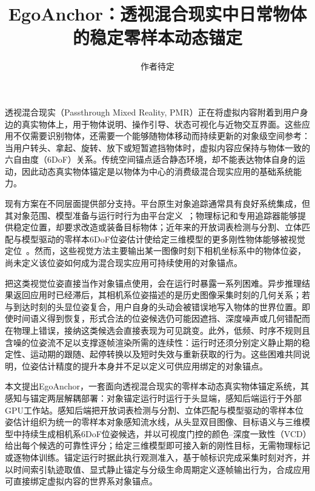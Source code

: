 \documentclass[review]{vgtc}
\title{EgoAnchor：透视混合现实中日常物体的稳定零样本动态锚定}
\author{作者待定}
\begin{document}
\label{sec:introduction}
\maketitle

透视混合现实（Passthrough Mixed Reality, PMR）正在将虚拟内容附着到用户身边的真实物体上，用于物体说明、操作引导、状态可视化与近物交互界面。这些应用不仅需要识别物体，还需要一个能够随物体移动而持续更新的对象级空间参考：当用户转头、拿起、旋转、放下或短暂遮挡物体时，虚拟内容应保持与物体一致的六自由度（6DoF）关系。传统空间锚点适合静态环境，却不能表达物体自身的运动，因此动态真实物体锚定是以物体为中心的消费级混合现实应用的基础系统能力。

现有方案在不同层面提供部分支持。平台原生对象追踪通常具有良好系统集成，但其对象范围、模型准备与运行时行为由平台定义~\cite{appleObjectAnchor,appleObjectTracking2026,azureObjectAnchors,metaDynamicObjectTracker}；物理标记和专用追踪器能够提供稳定位置，却要求改造或装备目标物体；近年来的开放词表检测与分割、立体匹配与模型驱动的零样本6DoF位姿估计使给定三维模型的更多刚性物体能够被视觉定位~\cite{foundationpose2023,megapose2022}。然而，这些视觉方法主要输出某一图像时刻下相机坐标系中的物体位姿，尚未定义该位姿如何成为混合现实应用可持续使用的对象锚点。

把这类视觉位姿直接当作对象锚点使用，会在运行时暴露一系列困难。异步推理结果返回应用时已经滞后，其相机系位姿描述的是历史图像采集时刻的几何关系；若与到达时刻的头显位姿复合，用户自身的头动会被错误地写入物体的世界位置。即使时间语义得到恢复，形式合法的位姿候选仍可能因遮挡、深度噪声或几何错配而在物理上错误，接纳这类候选会直接表现为可见跳变。此外，低频、时序不规则且含噪的位姿流不足以支撑逐帧渲染所需的连续性：运行时还须分别定义静止期的稳定性、运动期的跟随、起停转换以及短时失效与重新获取的行为。这些困难共同说明，位姿估计精度的提升本身并不足以定义可供应用绑定的对象锚点。

本文提出EgoAnchor，一套面向透视混合现实的零样本动态真实物体锚定系统，其感知与锚定两层解耦部署：对象锚定运行时运行于头显端，感知后端运行于外部GPU工作站。感知后端把开放词表检测与分割、立体匹配与模型驱动的零样本位姿估计组织为统一的零样本对象感知流水线，从头显双目图像、目标语义与三维模型中持续生成相机系6DoF位姿候选，并以可视度门控的颜色--深度一致性（VCD）给出每个候选的可靠性评分；给定三维模型即可接入新的刚性目标，无需物理标记或逐物体训练。锚定运行时据此执行观测准入，基于帧标识完成采集时刻对齐，并以时间索引轨迹取值、显式静止锚定与分级生命周期定义逐帧输出行为，合成应用可直接绑定虚拟内容的世界系对象锚点。
\end{document}
